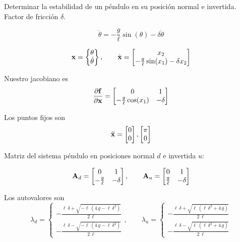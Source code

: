\begin{exercise}
Determinar la estabilidad de un péndulo en su posición normal e invertida. Factor de fricción $\delta$.

\[
\ddot{\theta} = -\frac{g}{\ell} \sin(\theta) - \delta \dot{\theta}
\]

\[
\mathbf{x} = \begin{Bmatrix}
\theta \\ \dot{\theta}
\end{Bmatrix}, \qquad \dot{\mathbf{x}} = \begin{bmatrix}
x_2 \\
-\frac{g}{\ell}\sin(x_1)-\delta x_2
\end{bmatrix}
\]

Nuestro jacobiano es
\[
\frac{\partial {\mathbf{f}}}{\partial {\mathbf{x}}} = \begin{bmatrix}
0 & 1 \\
-\frac{g}{\ell} \cos(x_1) & -\delta 
\end{bmatrix}
\]

Los puntos fijos son 
\[
\mathbf{\bar{x}} = \begin{bmatrix}
0\\0
\end{bmatrix},
\begin{bmatrix}
\pi\\0
\end{bmatrix}
\]

Matriz del sistema péndulo en posiciones normal $d$ e invertida $u$:

\[
\mathbf{A}_d = \begin{bmatrix}
0 & 1 \\
-\frac{g}{\ell} & -\delta
\end{bmatrix},\qquad
\mathbf{A}_u = \begin{bmatrix}
0 & 1 \\
\frac{g}{\ell} & -\delta
\end{bmatrix}
\]

Los autovalores son
\[
\lambda_{d}=\begin{cases}
-\frac{\ell \,\delta +\sqrt{-\ell\,\left(4\,g-\ell\,{\delta }^2\right)}}{2\,\ell} \\
-\frac{\ell\,\delta -\sqrt{-\ell\,\left(4\,g-\ell\,\delta ^2\right)}}{2\,\ell} 
\end{cases}, \qquad \lambda_u = \begin{cases}
-\frac{\ell\,\delta +\sqrt{\ell\,\left(\ell\,\delta ^2+4\,g\right)}}{2\,\ell } \\
-\frac{\ell\,\delta -\sqrt{\ell\,\left(\ell\,{\delta }^2+4\,g\right)}}{2\,\ell}
\end{cases}
\]


\end{exercise}

